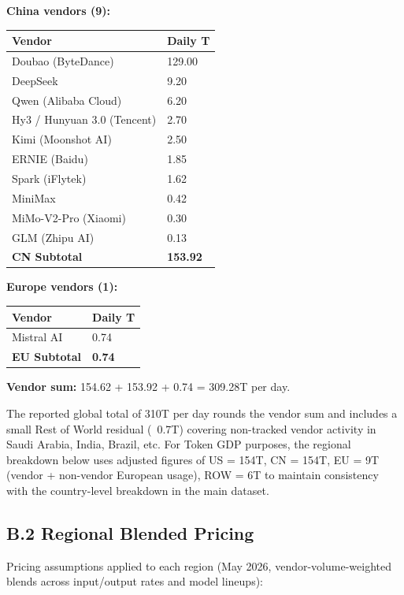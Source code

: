 \documentclass[11pt,a4paper]{article}
\begin{document}
\textbf{China vendors (9):}
\begin{center}
\begin{tabular}{ll}
\toprule
Vendor & Daily T \\
\midrule
Doubao (ByteDance) & 129.00 \\
DeepSeek & 9.20 \\
Qwen (Alibaba Cloud) & 6.20 \\
Hy3 / Hunyuan 3.0 (Tencent) & 2.70 \\
Kimi (Moonshot AI) & 2.50 \\
ERNIE (Baidu) & 1.85 \\
Spark (iFlytek) & 1.62 \\
MiniMax & 0.42 \\
MiMo-V2-Pro (Xiaomi) & 0.30 \\
GLM (Zhipu AI) & 0.13 \\
\textbf{CN Subtotal} & \textbf{153.92} \\
\bottomrule
\end{tabular}
\end{center}


\textbf{Europe vendors (1):}
\begin{center}
\begin{tabular}{ll}
\toprule
Vendor & Daily T \\
\midrule
Mistral AI & 0.74 \\
\textbf{EU Subtotal} & \textbf{0.74} \\
\bottomrule
\end{tabular}
\end{center}


\textbf{Vendor sum:} 154.62 + 153.92 + 0.74 = 309.28T per day.

The reported global total of 310T per day rounds the vendor sum and includes a small Rest of World residual (~0.7T) covering non-tracked vendor activity in Saudi Arabia, India, Brazil, etc. For Token GDP purposes, the regional breakdown below uses adjusted figures of US = 154T, CN = 154T, EU = 9T (vendor + non-vendor European usage), ROW = 6T to maintain consistency with the country-level breakdown in the main dataset.

\subsection{B.2 Regional Blended Pricing}

Pricing assumptions applied to each region (May 2026, vendor-volume-weighted blends across input/output rates and model lineups):
\end{document}
